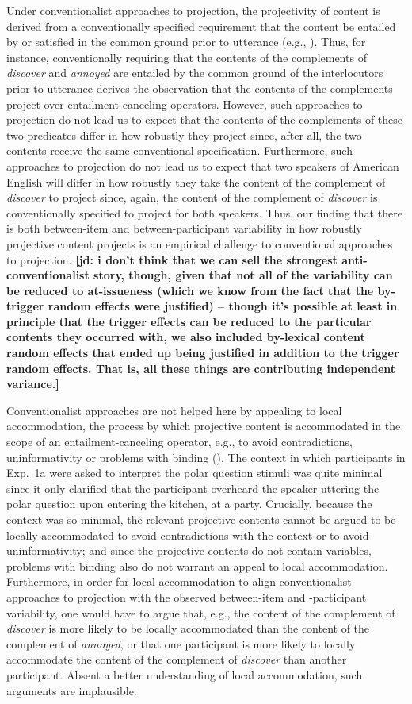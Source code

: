 \documentclass[11pt,fleqn]{article}
\newcommand{\6}{\mbox{$[\hspace*{-.6mm}[$}}
\newcommand{\9}{\mbox{$]\hspace*{-.6mm}]$}}
\newcommand{\jd}[1]{\textbf{\color{Green}[jd: #1]}}
\begin{document}
Under conventionalist approaches to projection, the projectivity of content is derived from a conventionally specified requirement that the content be entailed by or satisfied in the common ground prior to utterance (e.g., \citealt{heim83,vds92}). Thus, for instance, conventionally requiring that the contents of the complements of {\em discover} and {\em annoyed} are entailed by the common ground of the interlocutors prior to utterance derives the observation that the contents of the complements project over entailment-canceling operators. However, such approaches to projection do not lead us to expect that the contents of the complements of these two predicates differ in how robustly they project since, after all, the two contents receive the same conventional specification. Furthermore, such approaches to projection do not lead us to expect that two speakers of American English will differ in how robustly they take the content of the complement of {\em discover} to project since, again, the content of the complement of {\em discover} is conventionally specified to project for both speakers. Thus, our finding that there is both between-item and between-participant variability in how robustly projective content projects is an empirical challenge to conventional approaches to projection. \jd{i don't think that we can sell the strongest anti-conventionalist story, though, given that not all of the variability can be reduced to at-issueness (which we know from the fact that the by-trigger random effects were justified) -- though it's possible at least in principle that the trigger effects can be reduced to the particular contents they occurred with, we also included by-lexical content random effects that ended up being justified in addition to the trigger random effects. That is, all these things are contributing independent variance.}

Conventionalist approaches are not helped here by appealing to local accommodation, the process by which projective content is accommodated in the scope of an entailment-canceling operator, e.g., to avoid contradictions, uninformativity or problems with binding (\citealt{heim83,vds92}). The context in which participants in Exp.~1a were asked to interpret the polar question stimuli was quite minimal since it only clarified that the participant overheard the speaker uttering the polar question upon entering the kitchen, at a party. Crucially, because the context was so minimal, the relevant projective contents cannot be argued to be locally accommodated to avoid contradictions with the context or to avoid uninformativity; and since the projective contents do not contain variables, problems with binding also do not warrant an appeal to local accommodation. Furthermore, in order for local accommodation to align conventionalist approaches to projection with the observed between-item and -participant variability, one would have to argue that, e.g., the content of the complement of {\em discover} is more likely to be locally accommodated than the content of the complement of {\em annoyed}, or that one participant is more likely to locally accommodate the content of the complement of {\em discover} than another participant. Absent a better understanding of local accommodation, such arguments are implausible. 
\end{document}
